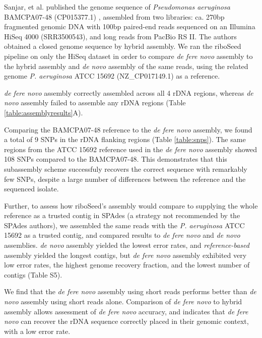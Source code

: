 \documentclass[a4,center,fleqn]{NAR}
\begin{document}
Sanjar, et al. published the genome sequence of \textit{Pseudomonas aeruginosa} BAMCPA07-48 (CP015377.1) \cite{Sanjar2016}, assembled from two libraries: ca. 270bp fragmented genomic DNA with 100bp paired-end reads sequenced on an Illumina HiSeq 4000 (SRR3500543), and long reads from PacBio RS II. The authors obtained a closed genome sequence by hybrid assembly. We ran the riboSeed pipeline on only the HiSeq dataset in order to compare \textit{de fere novo} assembly to the hybrid assembly and \textit{de novo} assembly of the same reads, using the related genome \textit{P. aeruginosa} ATCC 15692 (NZ\_CP017149.1) as a reference.

\textit{de fere novo} assembly correctly assembled across all 4 rDNA regions, whereas \textit{de novo} assembly failed to assemble any rDNA regions (Table \ref{table:assemblyresults}A).

Comparing the BAMCPA07-48 reference to the \textit{de fere novo} assembly, we found a total of 9 SNPs in the rDNA flanking regions (Table \ref{table:snps}). The same regions from the ATCC 15692 reference used in the \textit{de fere novo} assembly showed 108 SNPs compared to the BAMCPA07-48.  This demonstrates that this subassembly scheme successfuly recovers the correct sequence with remarkably few SNPs, despite a large number of differences between the reference and the sequenced isolate.

Further, to assess how riboSeed's assembly would compare to supplying the whole reference as a trusted contig in SPAdes (a strategy not recommended by the SPAdes authors), we assembled the same reads with the \textit{P. aeruginosa} ATCC 15692 as a trusted contig, and compared results to \textit{de fere novo} and \textit{de novo} assemblies. \textit{de novo} assembly yielded the lowest error rates, and \textit{reference-based}  assembly yielded the longest contigs, but \textit{de fere novo} assembly exhibited very low error rates, the highest genome recovery fraction, and the lowest number of contigs (Table S5).


We find that the \textit{de fere novo} assembly using short reads performs better than \textit{de novo} assembly using short reads alone. Comparison of \textit{de fere novo} to hybrid assembly allows assessment of \textit{de fere novo} accuracy, and indicates that \textit{de fere novo} can recover the rDNA sequence correctly placed in their genomic context, with a low error rate.
\end{document}
